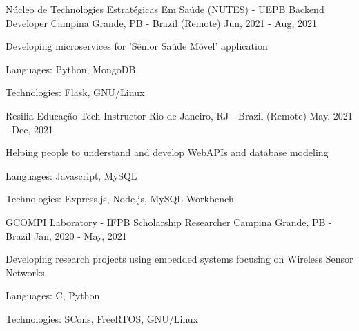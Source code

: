 \begin{cventries}
  \cventry
  {Núcleo de Technologies Estratégicas Em Saúde (NUTES) - UEPB} %
  {Backend Developer} %
  {Campina Grande, PB - Brazil (Remote)} %
  {Jun, 2021 - Aug, 2021} %
  {
    \begin{cvitems} %
      \item {Developing microservices for 'Sênior Saúde Móvel' application }
      \item {Languages: Python, MongoDB}
      \item {Technologies: Flask, GNU/Linux}
    \end{cvitems}
  }

  \cventry
  {Resilia Educação} %
  {Tech Instructor} %
  {Rio de Janeiro, RJ - Brazil (Remote)} %
  {May, 2021 - Dec, 2021} %
  {
    \begin{cvitems} %
      \item {Helping people to understand and develop WebAPIs and database modeling}
      \item {Languages: Javascript, MySQL}
      \item {Technologies: Express.js, Node.js, MySQL Workbench}
    \end{cvitems}
  }

  \cventry
  {GCOMPI Laboratory - IFPB} %
  {Scholarship Researcher} %
  {Campina Grande, PB - Brazil} %
  {Jan, 2020 - May, 2021} %
  {
    \begin{cvitems} %
      \item {Developing research projects using embedded systems focusing on Wireless Sensor Networks}
      \item {Languages: C, Python}
      \item {Technologies: SCons, FreeRTOS, GNU/Linux}
    \end{cvitems}
  }
\end{cventries}
